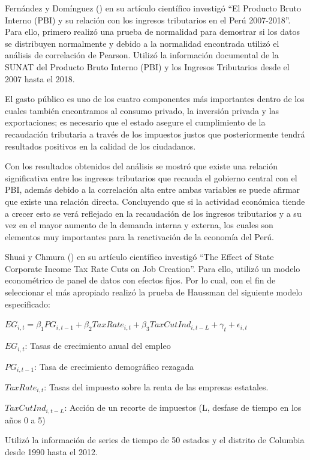 \documentclass[
  jou,
  floatsintext,
  longtable,
  a4paper,
  nolmodern,
  notxfonts,
  notimes,
  12pt,
  colorlinks=true,linkcolor=blue,citecolor=blue,urlcolor=blue]{apa7}
\begin{document}
Fernández y Domínguez () en
su artículo científico investigó ``El Producto Bruto Interno (PBI) y su
relación con los ingresos tributarios en el Perú 2007-2018''. Para ello,
primero realizó una prueba de normalidad para demostrar si los datos se
distribuyen normalmente y debido a la normalidad encontrada utilizó el
análisis de correlación de Pearson. Utilizó la información documental de
la SUNAT del Producto Bruto Interno (PBI) y los Ingresos Tributarios
desde el 2007 hasta el 2018.

El gasto público es uno de los cuatro componentes más importantes dentro
de los cuales también encontramos al consumo privado, la inversión
privada y las exportaciones; es necesario que el estado asegure el
cumplimiento de la recaudación tributaria a través de los impuestos
justos que posteriormente tendrá resultados positivos en la calidad de
los ciudadanos.

Con los resultados obtenidos del análisis se mostró que existe una
relación significativa entre los ingresos tributarios que recauda el
gobierno central con el PBI, además debido a la correlación alta entre
ambas variables se puede afirmar que existe una relación directa.
Concluyendo que si la actividad económica tiende a crecer esto se verá
reflejado en la recaudación de los ingresos tributarios y a su vez en el
mayor aumento de la demanda interna y externa, los cuales son elementos
muy importantes para la reactivación de la economía del Perú.

Shuai y Chmura () en su artículo
científico investigó ``The Effect of State Corporate Income Tax Rate
Cuts on Job Creation''. Para ello, utilizó un modelo econométrico de
panel de datos con efectos fijos. Por lo cual, con el fin de seleccionar
el más apropiado realizó la prueba de Haussman del siguiente modelo
especificado:

\(EG_{i, t} = \beta_{1}PG_{i, t-1} + \beta_{2}TaxRate_{i, t} + \beta_{3}TaxCutInd_{i, t-L} + \gamma_{t} + \epsilon_{i, t}\)

\(EG_{i, t}\): Tasas de crecimiento anual del empleo

\(PG_{i, t-1}\): Tasa de crecimiento demográfico rezagada

\(TaxRate_{i, t}\): Tasas del impuesto sobre la renta de las empresas
estatales.

\(TaxCutInd_{i, t-L}\): Acción de un recorte de impuestos (L, desfase de
tiempo en los años 0 a 5)

Utilizó la información de series de tiempo de 50 estados y el distrito
de Columbia desde 1990 hasta el 2012.
\end{document}
